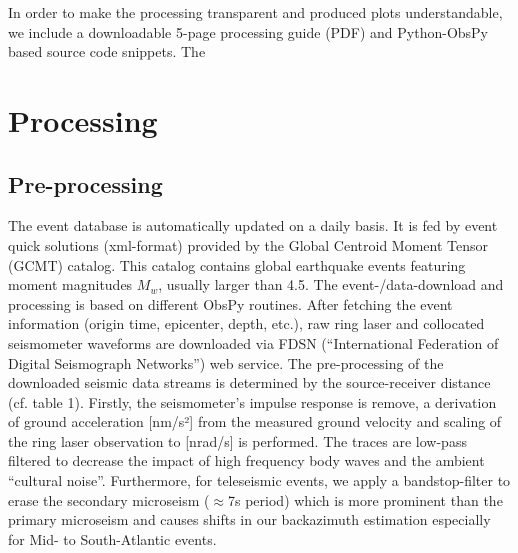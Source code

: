 \documentclass[12pt,reqno]{article} %
\begin{document}
In order to make the processing transparent and produced plots understandable, we include a downloadable 5-page processing guide (PDF) and Python-ObsPy based source code snippets. The
%
%
\section{Processing}
\label{sec:processing}
\subsection{Pre-processing}
The event database is automatically updated on a daily basis. It is fed by event quick solutions (xml-format) provided by the Global Centroid Moment Tensor (GCMT) catalog. This catalog contains global earthquake events featuring moment magnitudes $M_w$, usually larger than 4.5. The event-/data-download and processing is based on different ObsPy routines.
After fetching the event information (origin time, epicenter, depth, etc.), raw ring laser and collocated seismometer waveforms are downloaded via FDSN (“International Federation of Digital Seismograph Networks”) web service.
The pre-processing of the downloaded seismic data streams is determined by the source-receiver distance (cf. table 1). 
Firstly, the seismometer’s impulse response is remove,  a derivation of ground acceleration [nm/s²] from the measured ground velocity and scaling of the ring laser observation to [nrad/s] is performed. The traces are low-pass filtered to decrease the impact of high frequency body waves and the ambient “cultural noise”. Furthermore, for teleseismic events, we apply a bandstop-filter to erase the secondary microseism ($\approx$7s period) which is more prominent than the primary microseism \citep{Hadziioannou2012} and causes shifts in our backazimuth estimation especially for Mid- to South-Atlantic events.
%
\end{document}
